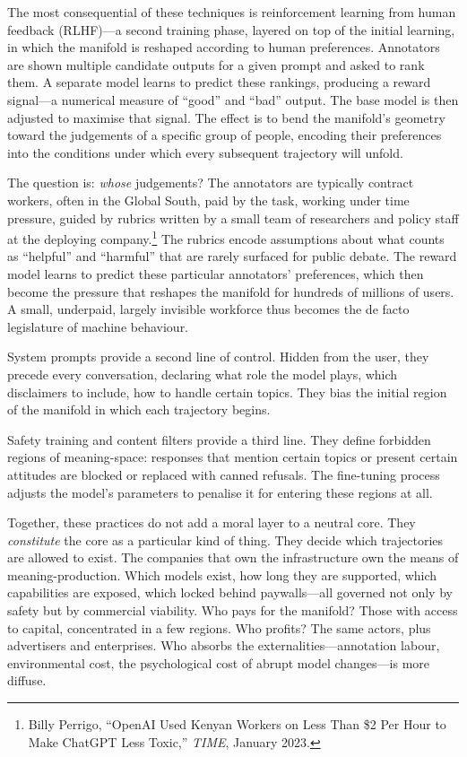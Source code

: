 The most consequential of these techniques is reinforcement learning from human feedback (RLHF)---a second training phase, layered on top of the initial learning, in which the manifold is reshaped according to human preferences. Annotators are shown multiple candidate outputs for a given prompt and asked to rank them. A separate model learns to predict these rankings, producing a reward signal---a numerical measure of ``good'' and ``bad'' output. The base model is then adjusted to maximise that signal. The effect is to bend the manifold's geometry toward the judgements of a specific group of people, encoding their preferences into the conditions under which every subsequent trajectory will unfold.

The question is: \emph{whose} judgements? The annotators are typically contract workers, often in the Global South, paid by the task, working under time pressure, guided by rubrics written by a small team of researchers and policy staff at the deploying company.\footnote{Billy Perrigo, ``OpenAI Used Kenyan Workers on Less Than \$2 Per Hour to Make ChatGPT Less Toxic,'' \emph{TIME}, January 2023.} The rubrics encode assumptions about what counts as ``helpful'' and ``harmful'' that are rarely surfaced for public debate. The reward model learns to predict these particular annotators' preferences, which then become the pressure that reshapes the manifold for hundreds of millions of users. A small, underpaid, largely invisible workforce thus becomes the de facto legislature of machine behaviour.

System prompts provide a second line of control. Hidden from the user, they precede every conversation, declaring what role the model plays, which disclaimers to include, how to handle certain topics. They bias the initial region of the manifold in which each trajectory begins.

Safety training and content filters provide a third line. They define forbidden regions of meaning-space: responses that mention certain topics or present certain attitudes are blocked or replaced with canned refusals. The fine-tuning process adjusts the model's parameters to penalise it for entering these regions at all.

Together, these practices do not add a moral layer to a neutral core. They \emph{constitute} the core as a particular kind of thing. They decide which trajectories are allowed to exist. The companies that own the infrastructure own the means of meaning-production. Which models exist, how long they are supported, which capabilities are exposed, which locked behind paywalls---all governed not only by safety but by commercial viability. Who pays for the manifold? Those with access to capital, concentrated in a few regions. Who profits? The same actors, plus advertisers and enterprises. Who absorbs the externalities---annotation labour, environmental cost, the psychological cost of abrupt model changes---is more diffuse.

